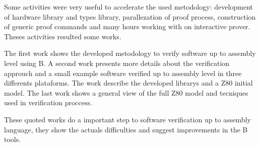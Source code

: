 \documentclass[11pt]{article} %
\begin{document}
% 
% 
% 
% 
% 
% 
% 
% 
Some activities were very useful to accelerate the used
metodology: development of hardware library and types library, parallezation of
proof process, construction of generic proof commands and many hours working
with on interactive prover. Theses activities resulted some works.


The first work \cite{DantasSemish2008} shows the developed metodology to verify
software up to assembly level using B. A second work\cite{Dantas_SBMF08}
presents more details about the verification approuch and a small example
software verified up to assembly level in three differents plataforms. 
The work \cite{Ermac2008} describe the developed librarys and a Z80 initial
model. The last work \cite{SBMF2009_micro} shows a general view of the full Z80
model and tecniques used in verification proccess.

These quoted works do a important step to software verification up to assembly
language, they show the actuals difficulties and suggest improvements in the
B tools. 





\end{document}
